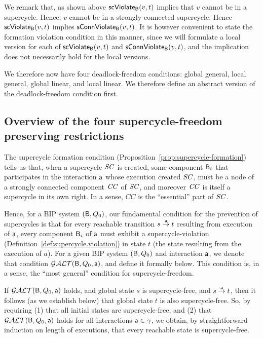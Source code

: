 We remark that, as shown above $\scV{v}{t}$ implies that $v$ cannot be in a
supercycle. Hence, $v$ cannot be in a strongly-connected supercycle.  Hence
$\scV{v}{t}$ implies $\connViol{v}{t}$. It is however convenient to state the
formation violation condition in this manner, since we will formulate a local version
for each of $\scV{v}{t}$ and $\connViol{v}{t}$, and the implication does not
necessarily hold for the local versions. 

We therefore now have four deadlock-freedom conditions: global general, local general, 
global linear, and local linear. We therefore define an abstract version of 
the deadlock-freedom condition first.




\subsection{Overview of the four supercycle-freedom preserving restrictions}

The supercycle formation condition
(Proposition~\ref{prop:supercycle-formation}) tells us that, when a
supercycle $\SC$ is created, some component $\B_i$ that participates
in the interaction $\act$ whose execution created $\SC$, must be a
node of a strongly connected component $\CC$ of $\SC$, and moreover
$\CC$ is itself a supercycle in its own right. In a sense, $CC$ is the
``essential'' part of $\SC$.

Hence, for a BIP system $(\B, Q_0)$, our fundamental condition for the
prevention of supercycles is that for every reachable transition
$s \goesto[\act] t$ resulting from execution of $\act$, every
component $\B_i$ of $\act$ must exhibit a supercycle-violation
(Definition~\ref{def:supercycle.violation}) in state $t$ (the state
resulting from the execution of $a$). For a given BIP system
$(\B, Q_0)$ and interaction $\act$, we denote that condition
$\GAO(\B, Q_0, \act)$, and define it formally below.  This condition
is, in a sense, the ``most general'' condition for supercycle-freedom.

If $\GAO(\B, Q_0, \act)$ holds, and global state $s$ is
supercycle-free, and $s \goesto[\act] t$, then it follows (as we
establish below) that global state $t$ is also supercycle-free.  So,
by requiring (1) that all initial states are supercycle-free, and (2)
that $\GAO(\B, Q_0, \act)$ holds for all interactions
$\act \in \gamma$, we obtain, by straightforward induction on length
of executions, that every reachable state is supercycle-free.


